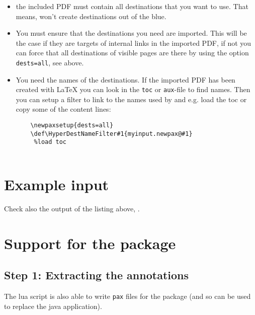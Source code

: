\documentclass[DIV=12,parskip=half-,bibliography=totoc]{scrartcl}
\begin{document}
\begin{itemize}
\item the included PDF must contain all destinations that you want to use. 
    That means,  won't create destinations out of the blue.
    
\item You must ensure that the destinations you need are imported. This 
    will be the case if they are targets of internal links in the imported 
    PDF, if not you can force that all destinations of visible pages are 
    there by using the option \texttt{dests=all}, see above. 

\item You need the names of the destinations. If the imported PDF has been 
    created with \LaTeX{} you can look in the \texttt{toc} or 
    \texttt{aux}-file to find names. Then you can setup a filter to link to 
    the names used by  and e.g. load the toc or copy some of 
    the content lines: 
    
    \begin{lstlisting}
    \newpaxsetup{dests=all}
    \def\HyperDestNameFilter#1{myinput.newpax@#1}    
     %load toc    
    
    \end{lstlisting}
   
 \end{itemize}         






\section{Example input}


Check also the output of the listing above, .

\section{Support for the \texorpdfstring{}{pax} package}

\subsection{Step 1: Extracting the annotations}
The lua script is also able to write \texttt{pax} files for the  package (and so can be used to replace the java application).
\end{document}
